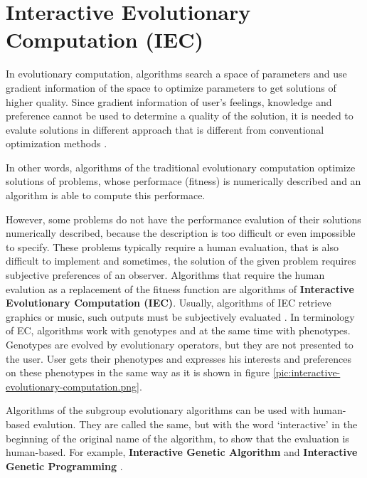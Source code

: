 \chapter{Interactive Evolutionary Computation (IEC)}

In evolutionary computation, algorithms search a space of parameters and use gradient information of the space to optimize parameters to get solutions of higher quality. Since gradient information of user's feelings, knowledge and preference cannot be used to determine a quality of the solution, it is needed to evalute solutions in different approach that is different from conventional optimization methods \cite{tagakipaper}.

In other words, algorithms of the traditional evolutionary computation optimize solutions of problems, whose performace (fitness) is numerically described and an algorithm is able to compute this performace.

However, some problems do not have the performance evalution of their solutions numerically described, because the description is too difficult or even impossible to specify. These problems typically require a human evaluation, that is also difficult to implement and sometimes, the solution of the given problem requires subjective preferences of an observer. Algorithms that require the human evalution as a replacement of the fitness function are algorithms of \textbf{Interactive Evolutionary Computation (IEC)}. Usually, algorithms of IEC retrieve graphics or music, such outputs must be subjectively evaluated \cite{tagakipaper}. In terminology of EC, algorithms work with genotypes and at the same time with phenotypes. Genotypes are evolved by evolutionary operators, but they are not presented to the user. User gets their phenotypes and expresses his interests and preferences on these phenotypes in the same way as it is shown in figure \ref{pic:interactive-evolutionary-computation.png}.


Algorithms of the subgroup evolutionary algorithms can be used with human-based evalution. They are called the same, but with the word ‘interactive’ in the beginning of the original name of the algorithm, to show that the evaluation is human-based. For example, \textbf{Interactive Genetic Algorithm} and \textbf{Interactive Genetic Programming} \cite{tagakipaper}.


